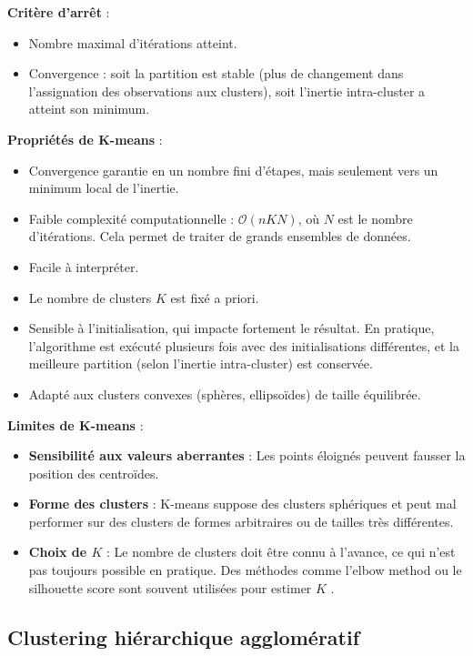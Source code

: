 \documentclass[10pt,a4paper]{article}
\begin{document}
\textbf{Critère d'arrêt} :
\begin{itemize}
    \item Nombre maximal d'itérations atteint.
    \item Convergence : soit la partition est stable (plus de changement dans l'assignation des observations aux clusters), soit l'inertie intra-cluster a atteint son minimum.
\end{itemize}

\textbf{Propriétés de K-means} :
\begin{itemize}
    \item Convergence garantie en un nombre fini d'étapes, mais seulement vers un minimum local de l'inertie.
    \item Faible complexité computationnelle : $\mathcal{O}(n K N)$, où $N$ est le nombre d'itérations. Cela permet de traiter de grands ensembles de données.
    \item Facile à interpréter.
    \item Le nombre de clusters $K$ est fixé a priori.
    \item Sensible à l'initialisation, qui impacte fortement le résultat. En pratique, l'algorithme est exécuté plusieurs fois avec des initialisations différentes, et la meilleure partition (selon l'inertie intra-cluster) est conservée.
    \item Adapté aux clusters convexes (sphères, ellipsoïdes) de taille équilibrée.
\end{itemize}

\textbf{Limites de K-means} :
\begin{itemize}
    \item \textbf{Sensibilité aux valeurs aberrantes} : Les points éloignés peuvent fausser la position des centroïdes.
    \item \textbf{Forme des clusters} : K-means suppose des clusters sphériques et peut mal performer sur des clusters de formes arbitraires ou de tailles très différentes.
    \item \textbf{Choix de $K$} : Le nombre de clusters doit être connu à l'avance, ce qui n'est pas toujours possible en pratique. Des méthodes comme l'elbow method ou le silhouette score sont souvent utilisées pour estimer $K$ \cite{kmeans-wikipedia, kmeans-towardsdatascience}.
\end{itemize}

\subsection*{Clustering hiérarchique agglomératif}
\end{document}
